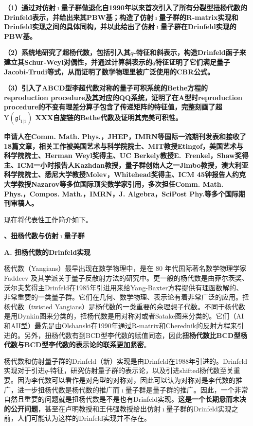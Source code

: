 \documentclass[12pt,UTF8,AutoFakeBold=4,a4paper]{ctexart}
\begin{document}
\textbf{（1）通过对仿射$\imath$量子群做退化自1990年以来首次引入了所有分裂型扭杨代数的Drinfeld表示，并给出来其PBW基；构造了仿射$\imath$量子群的R-matrix实现和Drinfeld实现之间的具体同构，并以此给出了仿射$\imath$量子群在Drinfeld实现的PBW基。}

\textbf{（2）系统地研究了超杨代数，包括引入其$q$-特征和斜表示，构造Drinfeld函子来建立其Schur-Weyl对偶性，并通过计算斜表示的$q$特征证明了它们满足量子Jacobi-Trudi等式，从而证明了数学物理里被广泛使用的CBR公式。}

\textbf{（3）引入了ABCD型李超代数对称的量子可积系统的Bethe方程的reproduction procedure及其对应的QQ系统，证明了在A型时reproduction procedure的不变有理差分算子包含了传递矩阵的特征值，完整刻画了超$\mathrm{Y}(\mathfrak{gl}_{1|1})$ XXX自旋链的Bethe代数及证明其完美可积性。}

\textbf{申请人在Comm. Math. Phys.，JHEP，IMRN等国际一流期刊发表和接收了18篇文章，相关工作被美国艺术与科学院院士、MIT教授Etingof，美国艺术与科学院院士、Herman Weyl奖得主、UC Berkely教授E.~Frenkel，Shaw奖得主、ICM一小时报告人Kazhdan教授，量子群创始人之一Jimbo教授，澳大利亚科学院院士、悉尼大学教授Molev，Whitehead奖得主、ICM 45钟报告人约克大学教授Nazarov等多位国际顶尖数学家引用，多次担任Comm. Math. Phys.，Compos. Math.，IMRN，J. Algebra，SciPost Phy.等多个国际期刊审稿人。}

\medskip

现在将代表性工作简介如下。

\textbf{、扭杨代数与仿射$\imath$量子群}

\textbf{A. 扭杨代数的Drinfeld实现}

杨代数（Yangians）最早出现在数学物理中，是在 80 年代国际著名数学物理学家 Faddeev 及其学派关于量子反散射方法的研究中。更一般的杨代数是由菲尔茨奖、沃尔夫奖得主Drinfeld在1985年引进用来给Yang-Baxter方程提供有理函数解的、非常重要的一类量子群。它们在几何、数学物理、表示论有着非常广泛的应用。扭杨代数（twisted Yangians）是杨代数的一类重要的余理想子代数。不同于杨代数是用Dynkin图来分类的，扭杨代数是用对称对或者Satake图来分类的。它们（AI和AII型）最先是由Olshanski在1990年通过R-matrix和Cherednik的反射方程来引进的。另外，扭杨代数有到BCD型李代数的赋值同态，因此\textbf{扭杨代数比BCD型杨代数与BCD型李代数的表示论的联系更加紧密}。

杨代数和仿射量子群的Drinfeld（新）实现是由Drinfeld在1988年引进的。Drinfeld实现对于引进$q$-特征，研究仿射量子群的表示论，以及引进shifted杨代数至关重要。因为李代数可以看作是对角型的对称对，因此可以认为对称对是李代数的推广，进一步扭杨代数是杨代数的推广而$\imath$量子群是量子群的推广。因此，一个非常自然且重要的问题就是扭杨代数是不是也有Drinfeld实现。\textbf{这是一个长期悬而未决的公开问题}，甚至在卢明教授和王伟强教授给出仿射$\imath$量子群的Drinfeld实现之前，人们可能认为这样的Drinfeld实现并不存在。
\end{document}
